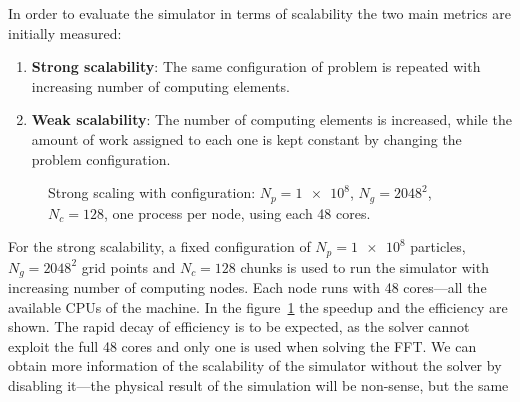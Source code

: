 In order to evaluate the simulator in terms of scalability the two main metrics 
are initially measured:
\begin{enumerate}
\item \textbf{Strong scalability}: The same configuration of problem is repeated 
with increasing number of computing elements.
\item \textbf{Weak scalability}: The number of computing elements is increased, 
while the amount of work assigned to each one is kept constant by changing the 
problem configuration.
\end{enumerate}
%
%
\begin{figure}[ht]%
\centering
{}
	\caption{Strong scaling with configuration: $N_p = \num{1e8}$, $N_g = 2048^2$,
	$N_c = 128$, one process per node, using each 48 cores.}
	\label{fig:strong-scaling}
\end{figure}%
%
For the strong scalability, a fixed configuration of $N_p = \num{1e8}$ 
particles, $N_g=2048^2$ grid points and $N_c=128$ chunks is used to run the 
simulator with increasing number of computing nodes. Each node runs with 48 
cores---all the available CPUs of the machine. In the 
figure~\ref{fig:strong-scaling} the speedup and the efficiency are shown.
The rapid decay of efficiency is to be expected, as the solver cannot exploit 
the full 48 cores and only one is used when solving the FFT. We can obtain more 
information of the scalability of the simulator without the solver by disabling 
it---the physical result of the simulation will be non-sense, but the same 
